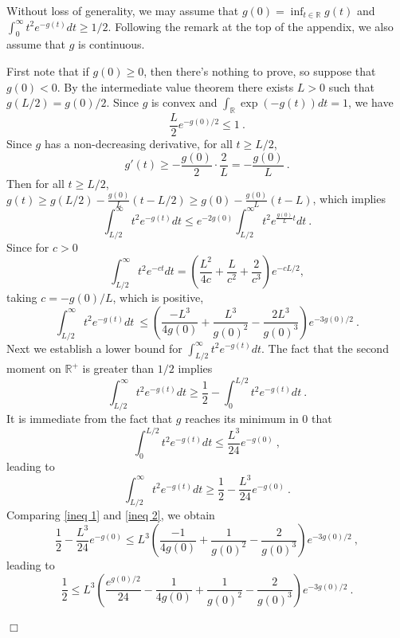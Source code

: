 \documentclass[12pt]{article}
\newcommand{\R}{\mathbb{R}}
\newcommand{\qed}{\hfill $\Box$}
\newenvironment{proof}{\par\noindent{\bf Proof:}}{\qed \par\medskip\noindent}
\begin{document}
\begin{proof}
  Without loss of generality, we may assume that
  $g(0)=\inf_{t\in\R}g(t)$ and
  $\int_0^{\infty}t^2e^{-g(t)}dt \geq 1/2$. Following the remark at the top of the appendix, we also assume that $g$ is continuous.
  
  First note that if $g(0)\geq0$, then there's nothing to prove,
  so suppose that $g(0)<0$.
By the intermediate value theorem there exists $L>0$ such that $g(L/2)=g(0)/2$.
Since $g$ is convex and $\int_{\R} \exp(-g(t))dt=1$, we have
\begin{equation}\label{ineq total mass}
\frac{L}{2}
 e^{-g(0)/2}\leq 1~.
\end{equation}
Since $g$ has a non-decreasing derivative, for all $t \geq L/2$,
\[
  g'(t)\geq -\frac{g(0)}{2}\cdot \frac{2}{L}=-\frac{g(0)}{L}~.
\]
Then for all $t\geq L/2$,   $g(t)\geq g(L/2)-\frac{g(0)}{L}(t-L/2) \geq  g(0)-\frac{g(0)}{L}(t-L)$, which implies
\[
\int_{L/2}^{\infty}t^2e^{-g(t)}dt  \leq  e^{-2g(0)} \int_{L/2}^{\infty}t^2e^{\frac{g(0)}{L} t}dt~.
\]
Since for $c>0$
$$ \int_{L/2}^{\infty}t^2e^{-ct}dt=\left( \frac{L^2}{4c}+\frac{L}{c^2}+\frac{2}{c^3}\right)  e^{-cL/2}, $$
taking $c=-g(0)/L$, which is positive,
\begin{equation}\label{ineq 1}
\int_{L/2}^{\infty}t^2e^{-g(t)}dt \ \leq\left( \frac{-L^3}{4g(0)}+\frac{L^3}{g(0)^2}-\frac{2L^3}{g(0)^3}\right) e^{-3g(0)/2}~.
\end{equation}
Next we establish a lower bound for
$\int_{L/2}^{\infty}t^2e^{-g(t)}dt$.
The fact that the second moment on $\R^+$ is greater than $1/2$ implies 
$$ \int_{L/2}^{\infty}t^2e^{-g(t)}dt \geq  \frac{1}{2}  - \int_{0}^{L/2}t^2e^{-g(t)}dt~.$$
It is immediate from the fact that $g$ reaches its minimum in $0$ that
$$  \int_{0}^{L/2}t^2e^{-g(t)}dt \leq \frac{L^3}{24}e^{-g(0)}~, $$
leading to
\begin{equation}\label{ineq 2}
\int_{L/2}^{\infty}t^2e^{-g(t)}dt  \geq \frac{1}{2}- \frac{L^3}{24}e^{-g(0)}~.
\end{equation}
Comparing \eqref{ineq 1} and \eqref{ineq 2}, we obtain
\begin{equation*}
\frac{1}{2}- \frac{L^3}{24}e^{-g(0)}\leq L^3 \left( \frac{-1}{4g(0)}+\frac{1}{g(0)^2}-\frac{2}{g(0)^3}\right) e^{-3g(0)/2}~,
\end{equation*}
leading to
\begin{equation}\label{ineq 3}
\frac{1}{2}\leq L^3 \left(\frac{e^{g(0)/2}}{24} - \frac{1}{4g(0)}+\frac{1}{g(0)^2}-\frac{2}{g(0)^3}\right) e^{-3g(0)/2}~. 
\end{equation}

\end{proof}
\end{document}
